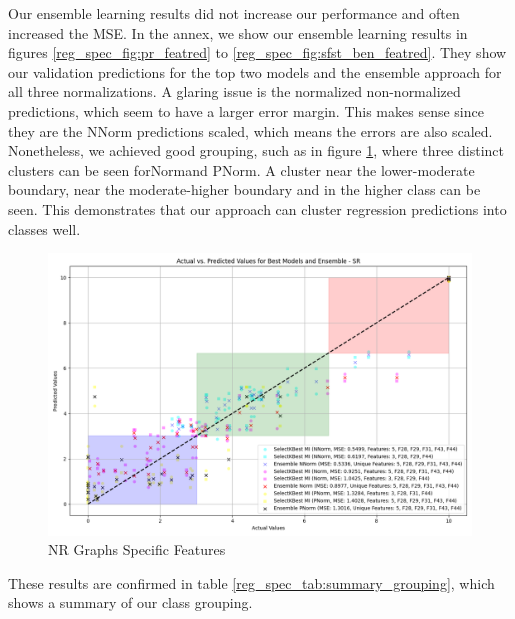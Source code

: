\documentclass[12pt,letterpaper]{article}
\begin{document}
Our ensemble learning results did not increase our performance and often increased the MSE.
In the annex, we show our ensemble learning results in figures \ref{reg_spec_fig:pr_featred} to \ref{reg_spec_fig:sfst_ben_featred}.
They show our validation predictions for the top two models and the ensemble approach for all three normalizations.
A glaring issue is the normalized non-normalized predictions, which seem to have a larger error margin.
This makes sense since they are the \ac{NNorm} predictions scaled, which means the errors are also scaled.
Nonetheless, we achieved good grouping, such as in figure \ref{reg_spec_fig:nr_featred_big}, where three distinct clusters can be seen for\ac{Norm}and \ac{PNorm}.
A cluster near the lower-moderate boundary, near the moderate-higher boundary and in the higher class can be seen.
This demonstrates that our approach can cluster regression predictions into classes well.

\begin{figure}
    \centering
    \includegraphics[width=1\linewidth]{reg_section_specific/featred_ensemble_learning/actual_vs_predicted_best_feature_selection_and_ensemble_SR_10.png}
    \caption{NR Graphs Specific Features}
    \label{reg_spec_fig:nr_featred_big}
\end{figure}

These results are confirmed in table \ref{reg_spec_tab:summary_grouping}, which shows a summary of our class grouping.
\end{document}
